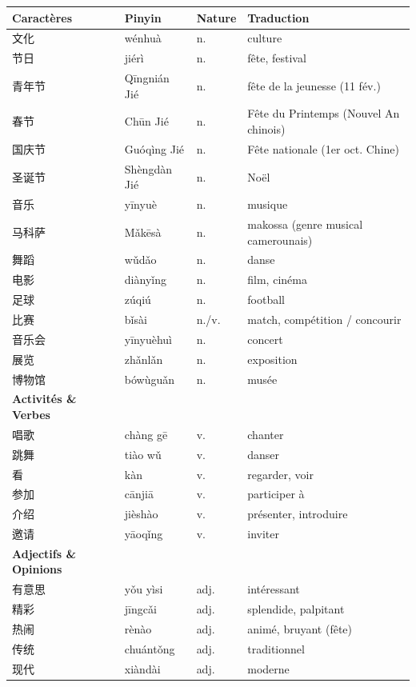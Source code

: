 \documentclass[11pt]{article}
\begin{document}
\begin{center}
\begin{tabularx}{\linewidth}{|X|X|X|X|}
\hline
\rowcolor{popblueL} \textbf{Caractères} & \textbf{Pinyin} & \textbf{Nature} & \textbf{Traduction} \\
\hline
文化 & wénhuà & n. & culture \\
节日 & jiérì & n. & fête, festival \\
青年节 & Qīngnián Jié & n. & fête de la jeunesse (11 fév.) \\
春节 & Chūn Jié & n. & Fête du Printemps (Nouvel An chinois) \\
国庆节 & Guóqìng Jié & n. & Fête nationale (1er oct. Chine) \\
圣诞节 & Shèngdàn Jié & n. & Noël \\
音乐 & yīnyuè & n. & musique \\
马科萨 & Mǎkēsà & n. & makossa (genre musical camerounais) \\
舞蹈 & wǔdǎo & n. & danse \\
电影 & diànyǐng & n. & film, cinéma \\
足球 & zúqiú & n. & football \\
比赛 & bǐsài & n./v. & match, compétition / concourir \\
音乐会 & yīnyuèhuì & n. & concert \\
展览 & zhǎnlǎn & n. & exposition \\
博物馆 & bówùguǎn & n. & musée \\
\hline
\rowcolor{poporangeL} \textbf{Activités \& Verbes} & & & \\
\hline
唱歌 & chàng gē & v. & chanter \\
跳舞 & tiào wǔ & v. & danser \\
看 & kàn & v. & regarder, voir \\
参加 & cānjiā & v. & participer à \\
介绍 & jièshào & v. & présenter, introduire \\
邀请 & yāoqǐng & v. & inviter \\
\hline
\rowcolor{popgreenL} \textbf{Adjectifs \& Opinions} & & & \\
\hline
有意思 & yǒu yìsi & adj. & intéressant \\
精彩 & jīngcǎi & adj. & splendide, palpitant \\
热闹 & rènào & adj. & animé, bruyant (fête) \\
传统 & chuántǒng & adj. & traditionnel \\
现代 & xiàndài & adj. & moderne \\

\end{tabularx}
\end{center}
\end{document}
